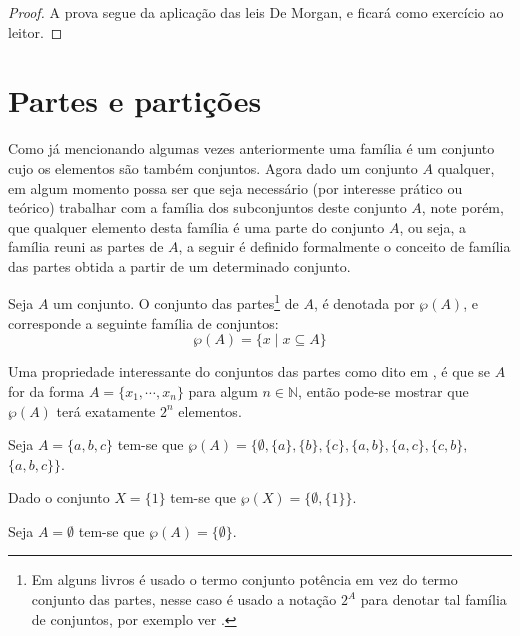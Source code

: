 \begin{proof}
	A prova segue da aplicação das leis De Morgan, e ficará como exercício ao leitor.
\end{proof}

\section{Partes e partições}

Como já mencionando algumas vezes anteriormente uma família é um conjunto cujo os elementos são também conjuntos. Agora dado um conjunto $A$ qualquer, em algum momento possa ser que seja necessário (por interesse prático ou teórico) trabalhar com a família dos subconjuntos deste conjunto $A$, note porém, que qualquer elemento desta família é uma parte do conjunto $A$, ou seja, a família reuni as partes de $A$, a seguir é definido formalmente o conceito de família das partes obtida a partir de um determinado conjunto.

\begin{definition}\label{def:ConjuntoDasPartes}
	Seja $A$ um conjunto. O conjunto das partes\footnote{Em alguns livros é usado o termo conjunto potência em vez do termo conjunto das partes, nesse caso é usado a notação $2^A$ para denotar tal família de conjuntos, por exemplo ver \cite{lipschutz2013-MD}.} de $A$, é denotada por $\wp(A)$, e corresponde a seguinte família de conjuntos:
	$$\wp(A) = \{x \mid x \subseteq A\}$$
\end{definition}

Uma propriedade interessante do conjuntos das partes como dito em \cite{lipschutz1978-TC}, é que se $A$ for da forma $A = \{x_1, \cdots, x_n\}$ para algum $n \in \mathbb{N}$, então pode-se mostrar que $\wp(A)$ terá exatamente $2^n$ elementos.

\begin{example}
	Seja $A = \{a, b, c\}$ tem-se que $\wp(A) = \{\emptyset, \{a\}, \{b\}, \{c\}, \{a, b\},\{a, c\}, \{c, b\},$ $\{a, b, c\}\}$.
\end{example}

\begin{example}
	Dado o conjunto $X = \{1\}$ tem-se que $\wp(X) = \{\emptyset, \{1\}\}$.
\end{example}

\begin{example}
	Seja $A = \emptyset$ tem-se que $\wp(A) = \{\emptyset\}$.
\end{example}

